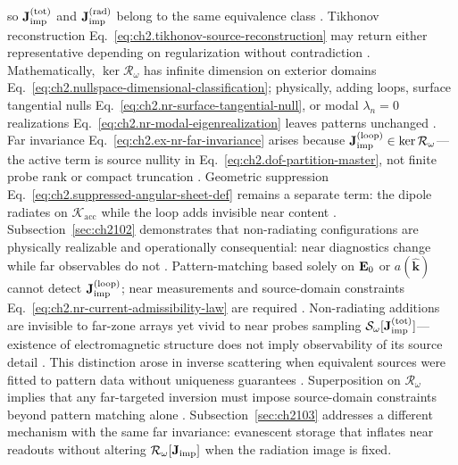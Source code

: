 so \(\mathbf{J}_{\mathrm{imp}}^{(\mathrm{tot})}\) and \(\mathbf{J}_{\mathrm{imp}}^{(\mathrm{rad})}\) belong to the same equivalence class
\cite{stratton1941}. Tikhonov reconstruction
Eq.~\eqref{eq:ch2.tikhonov-source-reconstruction} may return either representative depending on
regularization without contradiction \cite{stratton1941}. Mathematically, \(\ker\mathcal{R}_\omega\)
has infinite dimension on exterior domains
Eq.~\eqref{eq:ch2.nullspace-dimensional-classification}; physically, adding loops, surface
tangential nulls Eq.~\eqref{eq:ch2.nr-surface-tangential-null}, or modal \(\lambda_n=0\)
realizations Eq.~\eqref{eq:ch2.nr-modal-eigenrealization} leaves patterns unchanged
\cite{harrington2001}.
Far invariance Eq.~\eqref{eq:ch2.ex-nr-far-invariance} arises because
\(\mathbf{J}_{\mathrm{imp}}^{(\mathrm{loop})}\in\ker\mathcal{R}_\omega\)---the active term is source nullity in
Eq.~\eqref{eq:ch2.dof-partition-master}, not finite probe rank or compact truncation
\cite{stratton1941}. Geometric suppression
Eq.~\eqref{eq:ch2.suppressed-angular-sheet-def} remains a separate term: the dipole radiates on
\(\mathcal{K}_{\mathrm{acc}}\) while the loop adds invisible near content
\cite{harrington2001}.
Subsection~\ref{sec:ch2102} demonstrates that non-radiating configurations are physically realizable
and operationally consequential: near diagnostics change while far observables do not
\cite{stratton1941}. Pattern-matching based solely on
\(\mathbf{E}_0\) or \(a(\widehat{\mathbf{k}})\) cannot detect \(\mathbf{J}_{\mathrm{imp}}^{(\mathrm{loop})}\); near measurements
and source-domain constraints Eq.~\eqref{eq:ch2.nr-current-admissibility-law} are required
\cite{stratton1941}.
Non-radiating additions are invisible to far-zone arrays yet vivid to near probes sampling $\mathcal{S}_\omega[\mathbf{J}_{\mathrm{imp}}^{\mathrm{(tot)}}]$---existence of electromagnetic structure does not imply observability of its source detail \cite{devaney2004}. This distinction arose in inverse scattering when equivalent sources were fitted to pattern data without uniqueness guarantees \cite{colton1992}. Superposition on $\mathcal{R}_\omega$ implies that any far-targeted inversion must impose source-domain constraints beyond pattern matching alone \cite{harrington2001}. Subsection~\ref{sec:ch2103} addresses a different mechanism with the same far invariance: evanescent storage that inflates near readouts without altering $\mathcal{R}_\omega[\mathbf{J}_{\mathrm{imp}}]$ when the radiation image is fixed.
